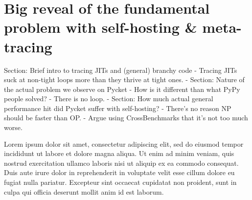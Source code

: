 \chapter{Big reveal of the fundamental problem with self-hosting \& meta-tracing}

Section: Brief intro to tracing JITs and (general) branchy code
		- Tracing JITs suck at non-tight loops more than they thrive at tight ones.
	- Section: Nature of the actual problem we observe on Pycket
		- How is it different than what PyPy people solved?
		- There is no loop.
	- Section: How much actual general performance hit did Pycket suffer with self-hosting?
		- There's no reason NP should be faster than OP.
		- Argue using CrossBenchmarks that it's not too much worse.

Lorem ipsum dolor sit amet, consectetur adipiscing elit, sed do eiusmod tempor incididunt ut labore et dolore magna aliqua. Ut enim ad minim veniam, quis nostrud exercitation ullamco laboris nisi ut aliquip ex ea commodo consequat. Duis aute irure dolor in reprehenderit in voluptate velit esse cillum dolore eu fugiat nulla pariatur. Excepteur sint occaecat cupidatat non proident, sunt in culpa qui officia deserunt mollit anim id est laborum.
